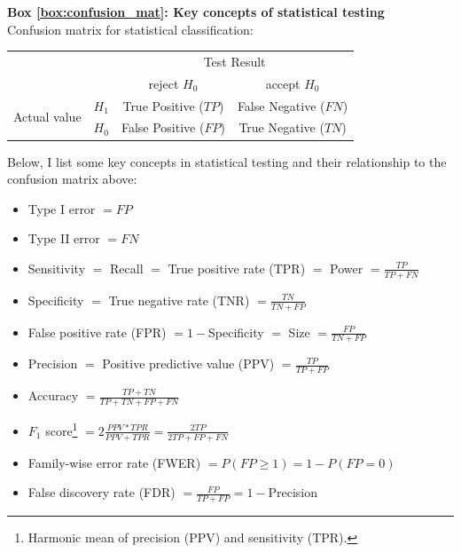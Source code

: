 \begin{Comment}
\hspace{-2.5mm}\textbf{Box \ref{box:confusion_mat}: Key concepts of statistical testing}\label{box:confusion_mat}\\
Confusion matrix for statistical classification:

\begin{center}
\begin{tabular}{l|l|c|c|}
\multicolumn{2}{c}{}&\multicolumn{2}{c}{Test Result}\\
\cline{3-4}
\multicolumn{2}{c|}{}&reject $H_0$&accept $H_0$\\
\cline{2-4}
\multirow{2}{*}{Actual value}& $H_1$ & True Positive ($TP$) & False Negative ($FN$)\\
\cline{2-4}
& $H_0$ & False Positive ($FP$) & True Negative ($TN$)\\
\cline{2-4}
\end{tabular}
\end{center}

\vspace{3mm}
Below, I list some key concepts in statistical testing and their relationship to the confusion matrix above:

\begin{itemize}
    \item Type I error $= FP$
    \item Type II error $= FN$
    \item Sensitivity $=$ Recall $=$ True positive rate (TPR) $=$ Power $=\frac{TP}{TP+FN}$
    \item Specificity $=$ True negative rate (TNR) $=\frac{TN}{TN+FP}$
    \item False positive rate (FPR) $= 1-$Specificity $=$ Size $=\frac{FP}{TN+FP}$
    \item Precision $=$ Positive predictive value (PPV) $=\frac{TP}{TP+FP}$
    \item Accuracy $=\frac{TP+TN}{TP+TN+FP+FN}$
    \item $F_1$ score\footnote{Harmonic mean of precision (PPV) and sensitivity (TPR).} $=2 \frac{PPV*TPR}{PPV+TPR}=\frac{2TP}{2TP+FP+FN}$
    \item Family-wise error rate (FWER) $=P(FP \geq 1)= 1 - P(FP=0)$
    \item False discovery rate (FDR) $=\frac{FP}{TP+FP}= 1- $Precision
\end{itemize}

\vfill

\end{Comment}

